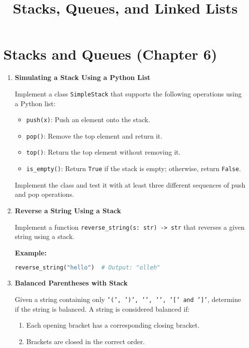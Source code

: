 \documentclass{article}
\title{Stacks, Queues, and Linked Lists}
\author{}
\date{}
\begin{document}
\maketitle

\section*{Stacks and Queues (Chapter 6)}

\begin{enumerate}
    \item \textbf{Simulating a Stack Using a Python List}
    
    Implement a class \texttt{SimpleStack} that supports the following operations using a Python list:
    \begin{itemize}
        \item \texttt{push(x)}: Push an element onto the stack.
        \item \texttt{pop()}: Remove the top element and return it.
        \item \texttt{top()}: Return the top element without removing it.
        \item \texttt{is\_empty()}: Return \texttt{True} if the stack is empty; otherwise, return \texttt{False}.
    \end{itemize}
    Implement the class and test it with at least three different sequences of push and pop operations.
    
    \item \textbf{Reverse a String Using a Stack}
    
    Implement a function \texttt{reverse\_string(s: str) -> str} that reverses a given string using a stack.
    
    \textbf{Example:}
    \begin{lstlisting}[language=Python]
    reverse_string("hello")  # Output: "olleh"
    \end{lstlisting}

    \item \textbf{Balanced Parentheses with Stack}
    
    Given a string containing only \texttt{'(', ')', '{', '}', '[' and ']'}, determine if the string is balanced. A string is considered balanced if:
    \begin{enumerate}
        \item Each opening bracket has a corresponding closing bracket.
        \item Brackets are closed in the correct order.
    \end{enumerate}
    

\end{enumerate}
\end{document}
